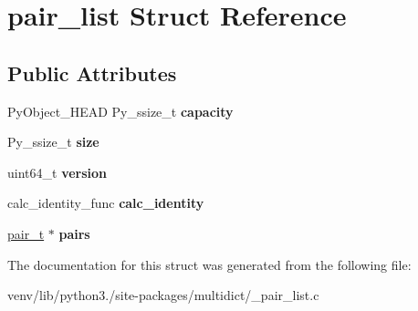 \hypertarget{structpair__list}{}\section{pair\+\_\+list Struct Reference}
\label{structpair__list}
\subsection*{Public Attributes}
\begin{DoxyCompactItemize}
\item 
\mbox{\label{structpair__list_afdca4951e5218cd45c072e12d1abafdd}} 
Py\+Object\+\_\+\+H\+E\+AD Py\+\_\+ssize\+\_\+t {\bfseries capacity}
\item 
\mbox{\label{structpair__list_a6462f158b8a6f33a3bb45c3183343c75}} 
Py\+\_\+ssize\+\_\+t {\bfseries size}
\item 
\mbox{\label{structpair__list_a3fb0367ef1c1fab0af8bb4b026bd9912}} 
uint64\+\_\+t {\bfseries version}
\item 
\mbox{\label{structpair__list_aecfd9e1b494650c08a99e701c6b526bb}} 
calc\+\_\+identity\+\_\+func {\bfseries calc\+\_\+identity}
\item 
\mbox{\label{structpair__list_a5e1fa772168e21605d16fad9edd18139}} 
\hyperlink{structpair}{pair\+\_\+t} $\ast$ {\bfseries pairs}
\end{DoxyCompactItemize}


The documentation for this struct was generated from the following file\+:\begin{DoxyCompactItemize}
\item 
venv/lib/python3./site-\/packages/multidict/\+\_\+pair\+\_\+list.\+c\end{DoxyCompactItemize}

